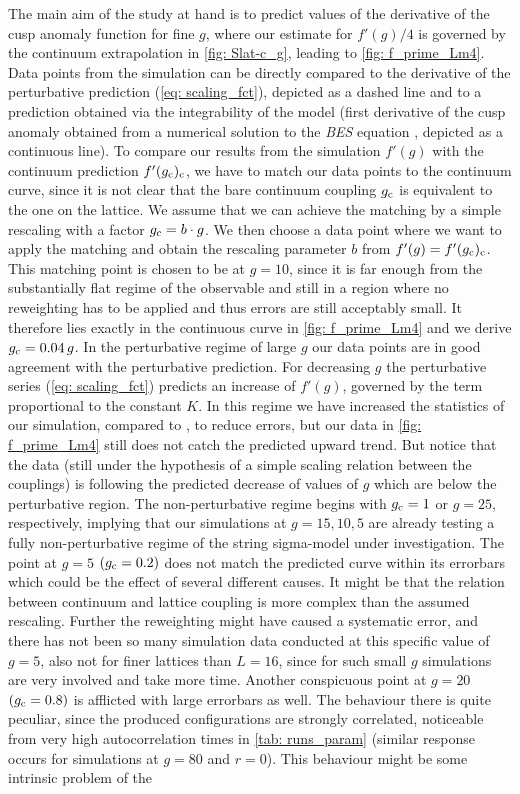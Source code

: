 The main aim of the study at hand is to predict values  of the derivative of the cusp anomaly function for fine $g$, where our estimate for $f'(g)/4$ is governed by the continuum extrapolation in \autoref{fig: Slat-c_g}, leading to \autoref{fig: f_prime_Lm4}. Data points from the simulation can be directly compared to the derivative of the perturbative prediction (\ref{eq: scaling_fct}), depicted as a dashed line and to a prediction obtained via the integrability of the model (first derivative of the cusp anomaly obtained from a numerical solution to the \textit{BES} equation \cite{Beisert:2006ez}, depicted as a continuous line). To compare our results from the simulation $f'(g)$ with the continuum prediction $f'(g_{\rm c})_{\rm c}$, we have to match our data points to the continuum curve, since it is not clear that the bare continuum coupling $g_{\rm c}$ is equivalent to the one on the lattice. We assume that we can achieve the matching by a simple rescaling with a factor $g_{\rm c}= b\cdot g$. We then choose a data point where we want to apply the matching and obtain the rescaling parameter $b$ from $f'(g)=f'(g_{\rm c})_{\rm c}$. This matching point is chosen to be at $g=10$, since it is far enough from the substantially flat regime of the observable and still in a region where no reweighting has to be applied and thus errors are still acceptably small. It therefore lies exactly in the continuous curve in \autoref{fig: f_prime_Lm4} and we derive $g_{\rm c}=0.04 \,g$. In the perturbative regime of large $g$ our data points are in good agreement with the perturbative prediction. For decreasing $g$ the perturbative series (\ref{eq: scaling_fct}) predicts an increase of $f'(g)$, governed by the term proportional to the  constant $K$. In this regime we have increased the statistics of our simulation, compared to \cite{Bianchi:2016cyv}, to reduce errors, but our data in \autoref{fig: f_prime_Lm4} still does not catch the predicted upward trend. But notice that the data (still under the hypothesis of a simple scaling relation between the couplings) is following the predicted decrease of values of $g$ which are below the perturbative region. The non-perturbative regime begins with $g_{\rm c}=1$ or $g=25$, respectively, implying that our simulations at $g=15,10,5$ are already testing a fully non-perturbative regime of the string sigma-model under investigation. The point at $g=5$ $(g_{\rm c}=0.2)$ does not match the predicted curve within its errorbars which could be the effect of several different causes. It might be that the relation between continuum and lattice coupling is more complex than the assumed rescaling. Further the reweighting might have caused a systematic error, and there has not been so many simulation data conducted at this specific value of $g=5$, also not for finer lattices than $L=16$, since for such small $g$ simulations are very involved and take more time. Another conspicuous point at $g=20$ $(g_{\rm c}=0.8)$ is afflicted with large errorbars as well. The behaviour there is quite peculiar, since the produced configurations are strongly correlated, noticeable from very high autocorrelation times in \autoref{tab: runs_param} (similar response occurs for simulations at $g=80$ and $r=0$). This behaviour might be some intrinsic problem of the 